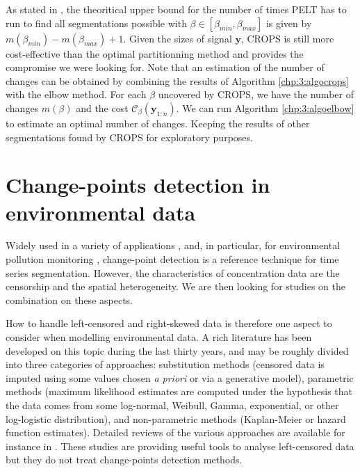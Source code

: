 As stated in \cite{haynes2017}, the theoritical upper bound for the number of times PELT has to run to find all segmentations possible with $\beta\in[\beta_{min},\beta_{max}]$ is given by $m(\beta_{min})-m(\beta_{max})+1$. Given the sizes of signal $\bm y$, CROPS is still more cost-effective than the optimal partitionning method and provides the compromise we were looking for. Note that an estimation of the number of changes can be obtained by combining the results of Algorithm  \ref{chp:3:algocrops} with the elbow method. For each $\beta$ uncovered by CROPS, we have the number of changes $m(\beta)$ and the cost $\mathcal{C}_{\beta}(\bm y_{1:n})$. We can run Algorithm \ref{chp:3:algoelbow} to estimate an optimal number of changes. Keeping the results of other segmentations found by CROPS for exploratory purposes. 

\section{Change-points detection in environmental data}\label{chp:3:4}

Widely used in a variety of applications \cite{basseville1993detection, chen2012parametric, liu2017change, reeves2007review, levy2009detection}, and, in particular, for environmental pollution monitoring \cite{costa2016}, change-point detection is a reference technique for time series segmentation. However, the characteristics of concentration data are the censorship and the spatial heterogeneity. We are then looking for studies on the combination on these aspects.  

How to handle left-censored and right-skewed data is therefore one aspect to consider when modelling environmental data. A rich literature has been developed on this topic during the last thirty years, and may be roughly divided into three categories of approaches: substitution methods (censored data is imputed using some values chosen \emph{a priori} or via a generative model), parametric methods (maximum likelihood estimates are computed under the hypothesis that the data comes from some log-normal, Weibull, Gamma, exponential, or other log-logistic distribution), and non-parametric methods (Kaplan-Meier or hazard function estimates). Detailed reviews of the various approaches are available  for instance in \cite{Authority2010,Hewett2007ACO,Mitra2008,Canales2018,Antweiler2008,Gillespie2010,shoari2018toward}. These studies are providing useful tools to analyse left-censored data but they do not treat change-points detection methods.

